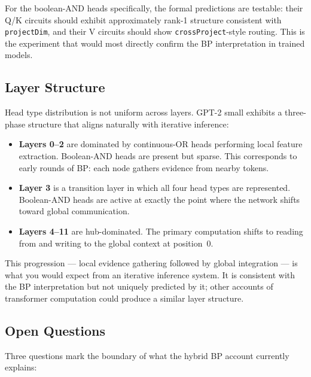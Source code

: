 For the boolean-AND heads specifically, the formal predictions are testable: their Q/K circuits should exhibit approximately rank-1 structure consistent with \texttt{projectDim}, and their V circuits should show \texttt{crossProject}-style routing. This is the experiment that would most directly confirm the BP interpretation in trained models.

\subsection*{Layer Structure}

Head type distribution is not uniform across layers. GPT-2 small exhibits a three-phase structure that aligns naturally with iterative inference:

\begin{itemize}
\item \textbf{Layers 0--2} are dominated by continuous-OR heads performing local feature extraction. Boolean-AND heads are present but sparse. This corresponds to early rounds of BP: each node gathers evidence from nearby tokens.

\item \textbf{Layer 3} is a transition layer in which all four head types are represented. Boolean-AND heads are active at exactly the point where the network shifts toward global communication.

\item \textbf{Layers 4--11} are hub-dominated. The primary computation shifts to reading from and writing to the global context at position~0.
\end{itemize}

This progression --- local evidence gathering followed by global integration --- is what you would expect from an iterative inference system. It is consistent with the BP interpretation but not uniquely predicted by it; other accounts of transformer computation could produce a similar layer structure.

\subsection*{Open Questions}

Three questions mark the boundary of what the hybrid BP account currently explains:


